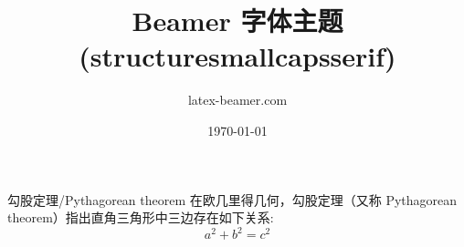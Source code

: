 \documentclass{ctexbeamer}
\title{Beamer 字体主题 (structuresmallcapsserif)}
\author{latex-beamer.com}
\date{\today}
\begin{document}
\begin{frame}
  \titlepage 
\end{frame}

\begin{frame}
   
\begin{block}{勾股定理/Pythagorean theorem}
在欧几里得几何，勾股定理（又称 Pythagorean theorem）指出直角三角形中三边存在如下关系:
\begin{equation}
  a^{2}+b^{2}=c^{2}
\end{equation}  
\end{block}   
 
\end{frame}
\end{document}
